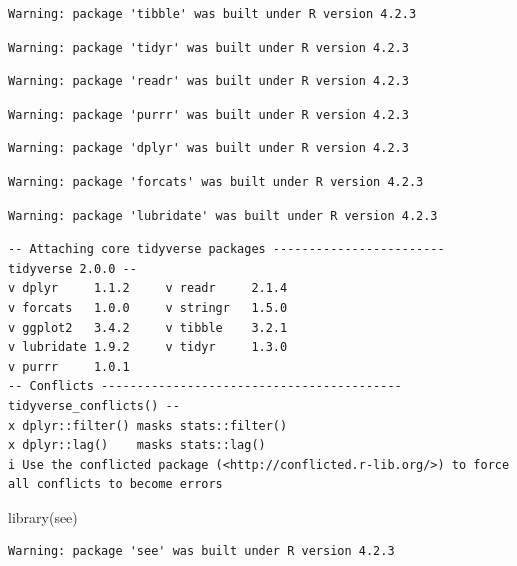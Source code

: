 \documentclass[
  letterpaper,
  DIV=11,
  numbers=noendperiod]{scrartcl}
\newenvironment{Shaded}{\begin{snugshade}}{\end{snugshade}}
\newcommand{\FunctionTok}[1]{\textcolor[rgb]{0.28,0.35,0.67}{#1}}
\newcommand{\NormalTok}[1]{\textcolor[rgb]{0.00,0.23,0.31}{#1}}
\begin{document}
\begin{verbatim}
Warning: package 'tibble' was built under R version 4.2.3
\end{verbatim}

\begin{verbatim}
Warning: package 'tidyr' was built under R version 4.2.3
\end{verbatim}

\begin{verbatim}
Warning: package 'readr' was built under R version 4.2.3
\end{verbatim}

\begin{verbatim}
Warning: package 'purrr' was built under R version 4.2.3
\end{verbatim}

\begin{verbatim}
Warning: package 'dplyr' was built under R version 4.2.3
\end{verbatim}

\begin{verbatim}
Warning: package 'forcats' was built under R version 4.2.3
\end{verbatim}

\begin{verbatim}
Warning: package 'lubridate' was built under R version 4.2.3
\end{verbatim}

\begin{verbatim}
-- Attaching core tidyverse packages ------------------------ tidyverse 2.0.0 --
v dplyr     1.1.2     v readr     2.1.4
v forcats   1.0.0     v stringr   1.5.0
v ggplot2   3.4.2     v tibble    3.2.1
v lubridate 1.9.2     v tidyr     1.3.0
v purrr     1.0.1     
-- Conflicts ------------------------------------------ tidyverse_conflicts() --
x dplyr::filter() masks stats::filter()
x dplyr::lag()    masks stats::lag()
i Use the conflicted package (<http://conflicted.r-lib.org/>) to force all conflicts to become errors
\end{verbatim}

\begin{Shaded}
\begin{Highlighting}[]
\FunctionTok{library}\NormalTok{(see)}
\end{Highlighting}
\end{Shaded}

\begin{verbatim}
Warning: package 'see' was built under R version 4.2.3
\end{verbatim}
\end{document}
